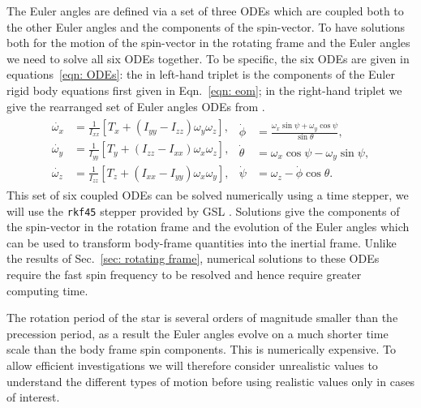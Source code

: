 \documentclass[../full_thesis/full_thesis.tex]{subfiles}
\begin{document}
The Euler angles are defined via a set of three ODEs which are coupled both to
the other Euler angles and the components of the spin-vector. To have solutions
both for the motion of the spin-vector in the rotating frame and the Euler
angles we need to solve all six ODEs together. To be specific, the six ODEs are
given in equations~\eqref{eqn: ODEs}: the in left-hand triplet is the
components of the Euler rigid body equations first given in Eqn.~\eqref{eqn:
eom}; in the right-hand triplet we give the rearranged set of Euler angles ODEs
from \citet{Landau1969}.
\begin{align}
\begin{split}
\dot{\omega_{x}} & = \frac{1}{I_{xx}}\left[T_{x} +
                      \left(I_{yy} - I_{zz}\right) \omega_{y} \omega_{z}\right],
\\
\dot{\omega_{y}} & = \frac{1}{I_{yy}}\left[T_{y} +
                      \left(I_{zz} - I_{xx}\right) \omega_{x} \omega_{z}\right],
\\
\dot{\omega_{z}} & =\frac{1}{I_{zz}}\left[T_{z} +
                      \left(I_{xx} - I_{yy}\right) \omega_{x} \omega_{y}\right],
\end{split}
\begin{split}
\dot{\phi} & = \frac{\omega_{x} \sin \psi + \omega_{y} \cos \psi}{\sin \theta},\\
\dot{\theta} & = \omega_{x} \cos \psi - \omega_{y} \sin \psi,\\
\dot{\psi} & = \omega_{z} - \dot{\phi} \cos \theta.
\end{split}
\label{eqn: ODEs}
\end{align}
This set of six coupled ODEs can be solved numerically using a time stepper, we
will use the \texttt{rkf45} stepper provided by GSL \citep{gough2009gnu}.
Solutions give the components of the spin-vector in the rotation frame and the
evolution of the Euler angles which can be used to transform body-frame
quantities into the inertial frame. Unlike the results of Sec.~\ref{sec:
rotating frame}, numerical solutions to these ODEs require the fast spin frequency
to be resolved and hence require greater computing time.

The rotation period of the star is several orders of magnitude smaller than the
precession period, as a result the Euler angles evolve on a much shorter time
scale than the body frame spin components. This is numerically expensive. To
allow efficient investigations we will therefore consider unrealistic values to
understand the different types of motion before using realistic values only in
cases of interest.
\end{document}
